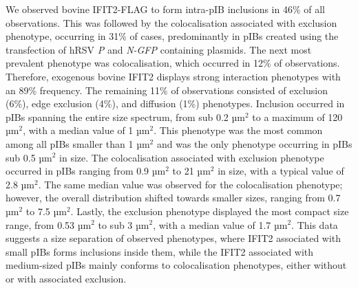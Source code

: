 We observed bovine IFIT2-FLAG to form intra-pIB inclusions in 46\% of all observations. This was followed by the colocalisation associated with exclusion phenotype, occurring in 31\% of cases, predominantly in pIBs created using the transfection of hRSV \textit{P} and \textit{N-GFP} containing plasmids. The next most prevalent phenotype was colocalisation, which occurred in 12\% of observations. Therefore, exogenous bovine IFIT2 displays strong interaction phenotypes with an 89\% frequency. The remaining 11\% of observations consisted of exclusion (6\%), edge exclusion (4\%), and diffusion (1\%) phenotypes. Inclusion occurred in pIBs spanning the entire size spectrum, from sub 0.2 \(\mbox{µm}^2\) to a maximum of 120 \(\mbox{µm}^2\), with a median value of 1 \(\mbox{µm}^2\). This phenotype was the most common among all pIBs smaller than 1 \(\mbox{µm}^2\) and was the only phenotype occurring in pIBs sub 0.5 \(\mbox{µm}^2\) in size. The colocalisation associated with exclusion phenotype occurred in pIBs ranging from 0.9 \(\mbox{µm}^2\) to 21 \(\mbox{µm}^2\) in size, with a typical value of 2.8 \(\mbox{µm}^2\). The same median value was observed for the colocalisation phenotype; however, the overall distribution shifted towards smaller sizes, ranging from 0.7 \(\mbox{µm}^2\) to 7.5 \(\mbox{µm}^2\). Lastly, the exclusion phenotype displayed the most compact size range, from 0.53 \(\mbox{µm}^2\) to sub 3 \(\mbox{µm}^2\), with a median value of 1.7 \(\mbox{µm}^2\). This data suggests a size separation of observed phenotypes, where IFIT2 associated with small pIBs forms inclusions inside them, while the IFIT2 associated with medium-sized pIBs mainly conforms to colocalisation phenotypes, either without or with associated exclusion.

